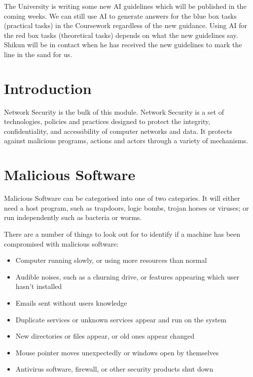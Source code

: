 
The University is writing some new AI guidelines which will be published in the coming weeks. We can still use AI to generate answers for the blue box tasks (practical tasks) in the Coursework regardless of the new guidance. Using AI for the red box tasks (theoretical tasks) depends on what the new guidelines say. Shikun will be in contact when he has received the new guidelines to mark the line in the sand for us.

\section{Introduction}
Network Security is the bulk of this module. Network Security is a set of technologies, policies and practices designed to protect the integrity, confidentiality, and accessibility of computer networks and data. It protects against malicious programs, actions and actors through a variety of mechanisms.

\section{Malicious Software}
Malicious Software can be categorised into one of two categories. It will either need a host program, such as trapdoors, logic bombs, trojan horses or viruses; or run independently such as bacteria or worms. 

There are a number of things to look out for to identify if a machine has been compromised with malicious software:
\begin{itemize}
    \item Computer running slowly, or using more resources than normal
    \item Audible noises, such as a churning drive, or features appearing which user hasn't installed
    \item Emails sent without users knowledge
    \item Duplicate services or unknown services appear and run on the system
    \item New directories or files appear, or old ones appear changed
    \item Mouse pointer moves unexpectedly or windows open by themselves
    \item Antivirus software, firewall, or other security products shut down
\end{itemize}

